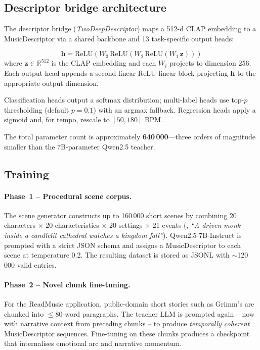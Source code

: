 \documentclass[10pt,twocolumn,letterpaper]{article}
\begin{document}
\subsection{Descriptor bridge architecture}

The descriptor bridge (\emph{TwoDeepDescriptor}) maps a 512-d CLAP
embedding to a MusicDescriptor via a shared backbone and 13 task-specific
output heads:

\begin{equation}
  \mathbf{h} = \mathrm{ReLU}(W_3\,\mathrm{ReLU}(W_2\,\mathrm{ReLU}(W_1\,\mathbf{z})))
  \label{eq:backbone}
\end{equation}
where $\mathbf{z}\in\mathbb{R}^{512}$ is the CLAP embedding and each $W_i$
projects to dimension 256.
Each output head appends a second linear-ReLU-linear block projecting
$\mathbf{h}$ to the appropriate output dimension.

Classification heads output a softmax distribution; multi-label heads use
top-$p$ thresholding (default $p{=}0.1$) with an argmax fallback.
Regression heads apply a sigmoid and, for tempo, rescale to $[50, 180]$ BPM.

The total parameter count is approximately \textbf{640\,000}---three orders of
magnitude smaller than the 7B-parameter Qwen2.5 teacher.

\subsection{Training}

\paragraph{Phase~1 -- Procedural scene corpus.}
The scene generator constructs up to 160\,000
short scenes by combining 20 characters $\times$ 20 characteristics $\times$
20 settings $\times$ 21 events (\eg, \textit{``A driven monk inside a
candlelit cathedral watches a kingdom fall''}).
Qwen2.5-7B-Instruct is prompted with a strict JSON schema and assigns a
MusicDescriptor to each scene at temperature 0.2.
The resulting dataset is stored as JSONL with $\sim$120\,000 valid entries.

\paragraph{Phase~2 -- Novel chunk fine-tuning.}
For the ReadMusic application, public-domain short stories such as Grimm's are chunked into ${\le}80$-word
paragraphs. The teacher LLM is prompted again -- now with narrative context from preceding chunks -- to produce \emph{temporally coherent} MusicDescriptor sequences. Fine-tuning on these chunks produces a checkpoint that internalises emotional arc and narrative momentum.
\end{document}
